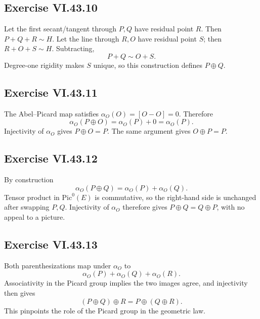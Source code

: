 \subsection*{Exercise VI.43.10}
\begin{solution}
Let the first secant/tangent through \(P,Q\) have residual point \(R\).  Then \(P+Q+R\sim H\).  Let the line through \(R,O\) have residual point \(S\); then \(R+O+S\sim H\).  Subtracting,
\[
P+Q\sim O+S.
\]
Degree-one rigidity makes \(S\) unique, so this construction defines \(P\oplus Q\).
\end{solution}

\subsection*{Exercise VI.43.11}
\begin{solution}
The Abel--Picard map satisfies \(\alpha_O(O)=[O-O]=0\).  Therefore
\[
\alpha_O(P\oplus O)=\alpha_O(P)+0=\alpha_O(P).
\]
Injectivity of \(\alpha_O\) gives \(P\oplus O=P\).  The same argument gives \(O\oplus P=P\).
\end{solution}

\subsection*{Exercise VI.43.12}
\begin{solution}
By construction
\[
\alpha_O(P\oplus Q)=\alpha_O(P)+\alpha_O(Q).
\]
Tensor product in \(\mathrm{Pic}^0(E)\) is commutative, so the right-hand side is unchanged after swapping \(P,Q\).  Injectivity of \(\alpha_O\) therefore gives \(P\oplus Q=Q\oplus P\), with no appeal to a picture.
\end{solution}

\subsection*{Exercise VI.43.13}
\begin{solution}
Both parenthesizations map under \(\alpha_O\) to
\[
\alpha_O(P)+\alpha_O(Q)+\alpha_O(R).
\]
Associativity in the Picard group implies the two images agree, and injectivity then gives
\[
(P\oplus Q)\oplus R=P\oplus(Q\oplus R).
\]
This pinpoints the role of the Picard group in the geometric law.
\end{solution}

